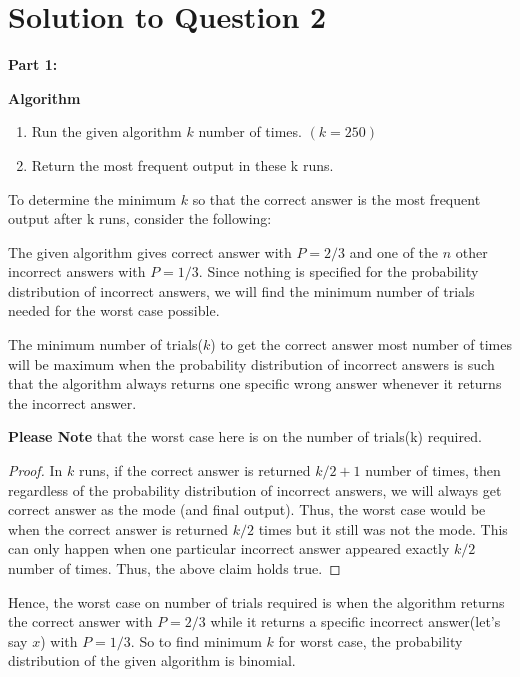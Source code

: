 \documentclass[11pt]{article}
\begin{document}
	 
	
	\section{Solution to Question 2}
	
	\textbf{Part 1:}
	
	\textbf{Algorithm}
	\begin{enumerate}
		\item Run the given algorithm $k$ number of times. $(k = 250)$
		\item Return the most frequent output in these k runs.
	\end{enumerate}
	To determine the minimum $k$ so that the correct answer is the most frequent output after k runs, consider the following:
	
	The given algorithm gives correct answer with $P = 2/3$ and one of the $n$ other incorrect answers with $P = 1/3$.
	Since nothing is specified for the probability distribution of incorrect answers, we will find the minimum number of trials needed for 
	the worst case possible. 
	
	 The minimum number of trials($k$) to get the correct answer most number of times will be maximum when the 
	probability distribution of incorrect answers is such that the algorithm always returns one specific wrong answer whenever it returns
	the incorrect answer.
	
	\textbf{Please Note} that the worst case here is on the number of trials(k) required.
	
	\begin{proof}
		In $k$ runs, if the correct answer is returned $k/2+1$ number of times, then regardless of the probability distribution of incorrect 
		answers, we will always get correct answer as the mode (and final output). Thus, the worst case would be when the correct 
		answer is returned $k/2$ times but it still was not the mode. This can only happen when one particular incorrect answer appeared exactly 
		$k/2$ number of times. \newline
		Thus, the above claim holds true.
	\end{proof}
	Hence, the worst case on number of trials required is when the algorithm returns the correct answer with $P = 2/3$ while it returns a 
	specific incorrect answer(let's say $x$) with $P = 1/3$. \newline
	So to find minimum $k$ for worst case, the probability distribution of the given algorithm is binomial.
	
\end{document}
